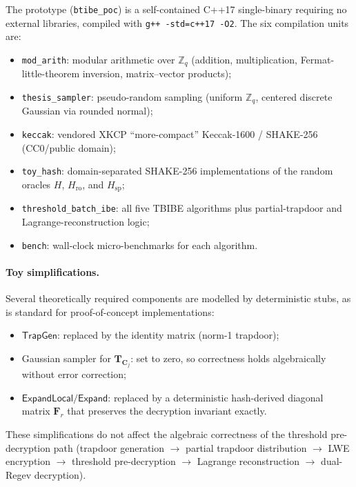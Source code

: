 The prototype (\texttt{btibe\_poc}) is a self-contained C++17 single-binary requiring no
external libraries, compiled with \texttt{g++ -std=c++17 -O2}.
The six compilation units are:
\begin{itemize}
    \item \texttt{mod\_arith}: modular arithmetic over $\mathbb{Z}_q$
          (addition, multiplication, Fermat-little-theorem inversion, matrix--vector products);
    \item \texttt{thesis\_sampler}: pseudo-random sampling (uniform $\mathbb{Z}_q$,
          centered discrete Gaussian via rounded normal);
    \item \texttt{keccak}: vendored XKCP ``more-compact'' Keccak-1600 / SHAKE-256
          (CC0/public domain);
    \item \texttt{toy\_hash}: domain-separated SHAKE-256 implementations of the random
          oracles $H$, $H_{\mathrm{ro}}$, and $H_{\mathrm{sp}}$;
    \item \texttt{threshold\_batch\_ibe}: all five TBIBE algorithms plus partial-trapdoor
          and Lagrange-reconstruction logic;
    \item \texttt{bench}: wall-clock micro-benchmarks for each algorithm.
\end{itemize}

\paragraph{Toy simplifications.}
Several theoretically required components are modelled by deterministic stubs, as is
standard for proof-of-concept implementations:
\begin{itemize}
    \item $\mathsf{TrapGen}$: replaced by the identity matrix (norm-1 trapdoor);
    \item Gaussian sampler for $\mathbf{T}_{\mathbf{C}_j}$: set to zero, so correctness
          holds algebraically without error correction;
    \item $\mathsf{ExpandLocal}/\mathsf{Expand}$: replaced by a deterministic
          hash-derived diagonal matrix $\mathbf{F}_r$ that preserves the
          decryption invariant exactly.
\end{itemize}
These simplifications do not affect the algebraic correctness of the threshold
pre-decryption path (trapdoor generation $\to$ partial trapdoor distribution $\to$
LWE encryption $\to$ threshold pre-decryption $\to$ Lagrange reconstruction $\to$
dual-Regev decryption).


